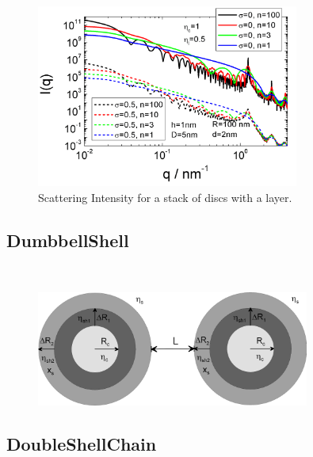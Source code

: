 \begin{figure}[htb]
\begin{center}
\includegraphics[width=0.768\textwidth,height=0.528\textwidth]{../images/form_factor/cluster/StackedDiscsIQ.png}
\end{center}
\caption{Scattering Intensity for a stack of discs with a layer.}
\label{fig:StackedDiscs}
\end{figure}


\clearpage
\subsection{DumbbellShell}
\label{sect:DumbbellShell}
~\\

\begin{figure}[htb]
\begin{center}
\includegraphics[width=0.8\textwidth,height=0.337\textwidth]{../images/form_factor/cluster/l_doubleshell.png}
\end{center}
\caption{} \label{DumbbellShell}
\end{figure}


\clearpage
\subsection{DoubleShellChain}
\label{sect:DoubleShellChain}
~\\

